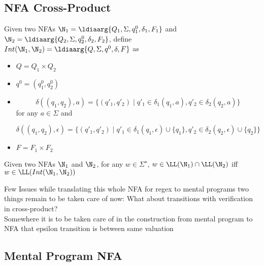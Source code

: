 \subsection{NFA Cross-Product}
\begin{defi}\label{defi:nfaintersect}
    Given two NFAs $\N_1 = \ldiaarg{Q_1, \Sigma, q^0_1, \delta_1, F_1}$ and $\N_2 = \ldiaarg{Q_2, \Sigma, q^0_2, \delta_2, F_2}$, define $Int(\N_1, \N_2) = \ldiaarg{Q, \Sigma, q^0, \delta, F}$ as
    \begin{itemize}
        \item $Q = Q_1\times Q_2$
        \item $q^0 = (q^0_1, q^0_2)$
        \item $$\delta((q_1, q_2), a) = \{(q'_1, q'_2)\mid q'_1\in\delta_1(q_1, a), q'_2\in\delta_2(q_2, a)\}$$ for any $a\in\Sigma$ and

        $$
        \delta((q_1, q_2), \epsilon) = \{(q'_1, q'_2)\mid q'_1\in\delta_1(q_1, \epsilon)\cup\{q_1\}, q'_2\in\delta_2(q_2, \epsilon)\cup\{q_2\}\}
        $$

        \item $F = F_1\times F_2$
    \end{itemize}
\end{defi}

\begin{theorem}
    Given two NFAs $\N_1$ and $\N_2$, for any $w\in\Sigma^\star$, $w\in\LL(\N_1)\cap\LL(\N_2)$ iff $w\in\LL(Int(\N_1,\N_2))$
\end{theorem}

Few Issues while translating this whole NFA for regex to mental programs two things remain to be taken care of now:
What about transitions with verification in cross-product?\\
Somewhere it is to be taken care of in the construction from mental program to NFA that epsilon transition is between same valuation

\newcommand{\nfa}{\ensuremath{\mathrm{nfa}}}
\subsection{Mental Program NFA}

